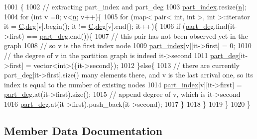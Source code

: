 \begin{DoxyCode}
1001 \{
1002   \textcolor{comment}{// extracting part\_index and part\_deg}
1003   \hyperlink{classmarked__graph__encoder_a1d3e2b90f5d46244fd4cb33c69ac81f1}{part\_index}.resize(\hyperlink{classmarked__graph__encoder_a4c66d9fdbc14c97523715aac7e4511cb}{n});
1004   \textcolor{keywordflow}{for} (\textcolor{keywordtype}{int} v =0; v<\hyperlink{classmarked__graph__encoder_a4c66d9fdbc14c97523715aac7e4511cb}{n}; v++)\{
1005     \textcolor{keywordflow}{for} (map< pair< int, int >, \textcolor{keywordtype}{int} >::iterator it = \hyperlink{classmarked__graph__encoder_af82bc0653414091291cb75553a407bdb}{C}.\hyperlink{classcolored__graph_ae3269d35c1b022bc70d195bebd4e1b8a}{deg}[v].begin(); it != 
      \hyperlink{classmarked__graph__encoder_af82bc0653414091291cb75553a407bdb}{C}.\hyperlink{classcolored__graph_ae3269d35c1b022bc70d195bebd4e1b8a}{deg}[v].end(); it++)\{
1006       \textcolor{keywordflow}{if} (\hyperlink{classmarked__graph__encoder_a55ea2edb2609dfc287432f61900d6ad1}{part\_deg}.find(it->first) == \hyperlink{classmarked__graph__encoder_a55ea2edb2609dfc287432f61900d6ad1}{part\_deg}.end())\{
1007         \textcolor{comment}{// this pair has not been observed yet in the graph}
1008         \textcolor{comment}{// so v is the first index node}
1009         \hyperlink{classmarked__graph__encoder_a1d3e2b90f5d46244fd4cb33c69ac81f1}{part\_index}[v][it->first] = 0;
1010         \textcolor{comment}{// the degree of v in the partition graph is indeed it->second}
1011         \hyperlink{classmarked__graph__encoder_a55ea2edb2609dfc287432f61900d6ad1}{part\_deg}[it->first] = vector<int>(\{it->second\}); 
1012       \}\textcolor{keywordflow}{else}\{
1013         \textcolor{comment}{// there are currently part\_deg[it->first].size() many elements there, and v is the last arrival
       one, so its index is equal to the number of existing nodes }
1014         \hyperlink{classmarked__graph__encoder_a1d3e2b90f5d46244fd4cb33c69ac81f1}{part\_index}[v][it->first] = \hyperlink{classmarked__graph__encoder_a55ea2edb2609dfc287432f61900d6ad1}{part\_deg}.at(it->first).size();
1015         \textcolor{comment}{// append degree of v, which is it->second}
1016         \hyperlink{classmarked__graph__encoder_a55ea2edb2609dfc287432f61900d6ad1}{part\_deg}.at(it->first).push\_back(it->second); 
1017       \}
1018     \}
1019   \}
1020 \}
\end{DoxyCode}


\subsection{Member Data Documentation}
\mbox{\label{classmarked__graph__encoder_af82bc0653414091291cb75553a407bdb}} 
